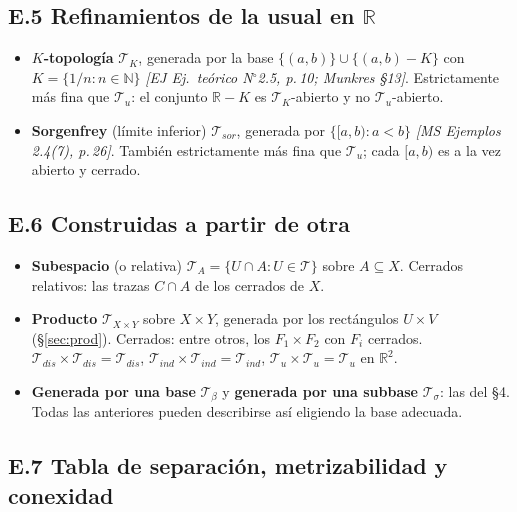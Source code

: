 \documentclass[11pt,a4paper]{article}
\theoremstyle{definition}
\theoremstyle{plain}
\newcommand{\fnt}[1]{{\normalfont\small\itshape\color{gray!150!black}[#1]}}
\newcommand{\R}{\mathbb{R}}
\newcommand{\N}{\mathbb{N}}
\newcommand{\tp}{\mathcal{T}}
\begin{document}
\subsection*{E.5 Refinamientos de la usual en $\R$}

\begin{itemize}[leftmargin=1.4em,itemsep=3pt]
\item \textbf{$K$-topología} $\tp_K$, generada por la base $\{(a,b)\}\cup\{(a,b)-K\}$ con $K=\{1/n: n\in\N\}$ \fnt{EJ Ej.\ teórico N$^\circ$2.5, p.\,10; Munkres \S13}. Estrictamente más fina que $\tp_u$: el conjunto $\R-K$ es $\tp_K$-abierto y no $\tp_u$-abierto.
\item \textbf{Sorgenfrey} (límite inferior) $\tp_{sor}$, generada por $\{[a,b): a<b\}$ \fnt{MS Ejemplos 2.4(7), p.\,26}. También estrictamente más fina que $\tp_u$; cada $[a,b)$ es a la vez abierto y cerrado.
\end{itemize}

\subsection*{E.6 Construidas a partir de otra}

\begin{itemize}[leftmargin=1.4em,itemsep=3pt]
\item \textbf{Subespacio} (o relativa) $\tp_A=\{U\cap A: U\in\tp\}$ sobre $A\subseteq X$. Cerrados relativos: las trazas $C\cap A$ de los cerrados de $X$.
\item \textbf{Producto} $\tp_{X\times Y}$ sobre $X\times Y$, generada por los rectángulos $U\times V$ (\S\ref{sec:prod}). Cerrados: entre otros, los $F_1\times F_2$ con $F_i$ cerrados. $\tp_{dis}\times\tp_{dis}=\tp_{dis}$, $\tp_{ind}\times\tp_{ind}=\tp_{ind}$, $\tp_u\times\tp_u=\tp_u$ en $\R^2$.
\item \textbf{Generada por una base} $\tp_\beta$ y \textbf{generada por una subbase} $\tp_\sigma$: las del \S4. Todas las anteriores pueden describirse así eligiendo la base adecuada.
\end{itemize}

\subsection*{E.7 Tabla de separación, metrizabilidad y conexidad}
\end{document}
